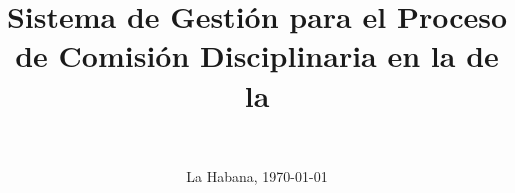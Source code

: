 \documentclass[12pt,final, spanish]{report}
\date{La Habana, \today}
\title{{Sistema de Gestión para el Proceso de Comisión Disciplinaria en la \Fac de la \uci}\ucilogo}
\author{\autorA\\\autorB}
\begin{document}
  \maketitle
  
  
  
  
  
  
  \tableofcontents
  \listoffigures
  \listoftables
  \pagebreak
  
  
  
  
  
  
  \appendix
  
  
  
\end{document}
